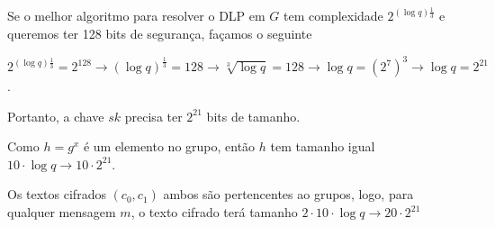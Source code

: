 \documentclass{article}
\begin{document}
    Se o melhor algoritmo para resolver o DLP em $G$ tem complexidade $2^{(\log q)\frac{1}{3}}$ e queremos ter 128 bits de segurança, façamos o seguinte

    $2^{(\log q)\frac{1}{3}} = 2^{128} \rightarrow (\log q)^\frac{1}{3} = 128 \rightarrow \sqrt[3]{\log q} = 128 \rightarrow \log q = (2^{7})^3 \rightarrow \log q = 2^{21}$.

    Portanto, a chave $sk$ precisa ter $2^{21}$ bits de tamanho.

    Como $h = g^x$ é um elemento no grupo, então $h$ tem tamanho igual $10 \cdot \log q \rightarrow 10 \cdot 2^{21}$.

    Os textos cifrados $(c_0,c_1)$ ambos são pertencentes ao grupos, logo, para qualquer mensagem $m$, o texto cifrado terá tamanho $2 \cdot 10 \cdot \log q \rightarrow 20 \cdot 2^{21}$
\end{document}
